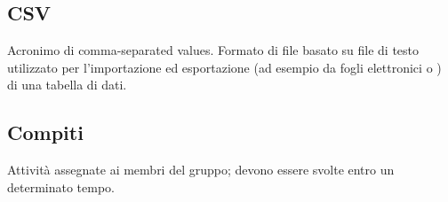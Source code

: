 \subsection*{CSV}
Acronimo di comma-separated values. Formato di file basato su file di testo utilizzato per l'importazione ed esportazione (ad esempio da fogli elettronici o ) di una tabella di dati. 

\subsection*{Compiti}
Attività assegnate ai membri del gruppo; devono essere svolte entro un determinato tempo.

